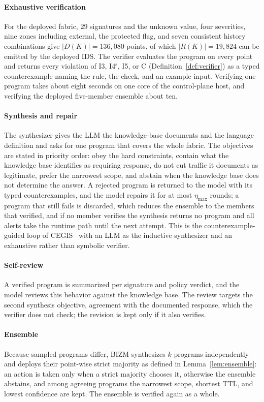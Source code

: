 \documentclass[final,5p]{elsarticle}
\begin{document}
\paragraph{Exhaustive verification}
For the deployed fabric, 29 signatures and the unknown value, four severities, nine zones including external, the protected flag, and seven consistent history combinations give $|D(K)|=136{,}080$ points, of which $|R(K)|=19{,}824$ can be emitted by the deployed IDS. The verifier evaluates the program on every point and returns every violation of I3, I4$^{\mathrm{s}}$, I5, or C (Definition~\ref{def:verifier}) as a typed counterexample naming the rule, the check, and an example input. Verifying one program takes about eight seconds on one core of the control-plane host, and verifying the deployed five-member ensemble about ten.

\paragraph{Synthesis and repair}
The synthesizer gives the LLM the knowledge-base documents and the language definition and asks for one program that covers the whole fabric. The objectives are stated in priority order: obey the hard constraints, contain what the knowledge base identifies as requiring response, do not cut traffic it documents as legitimate, prefer the narrowest scope, and abstain when the knowledge base does not determine the answer. A rejected program is returned to the model with its typed counterexamples, and the model repairs it for at most $\eta_{\max}$ rounds; a program that still fails is discarded, which reduces the ensemble to the members that verified, and if no member verifies the synthesis returns no program and all alerts take the runtime path until the next attempt. This is the counterexample-guided loop of CEGIS~\cite{solarlezama2006sketching} with an LLM as the inductive synthesizer and an exhaustive rather than symbolic verifier.

\paragraph{Self-review}
A verified program is summarized per signature and policy verdict, and the model reviews this behavior against the knowledge base. The review targets the second synthesis objective, agreement with the documented response, which the verifier does not check; the revision is kept only if it also verifies.

\paragraph{Ensemble}
Because sampled programs differ, BIZM synthesizes $k$ programs independently and deploys their point-wise strict majority as defined in Lemma~\ref{lem:ensemble}: an action is taken only when a strict majority chooses it, otherwise the ensemble abstains, and among agreeing programs the narrowest scope, shortest TTL, and lowest confidence are kept. The ensemble is verified again as a whole.
\end{document}
